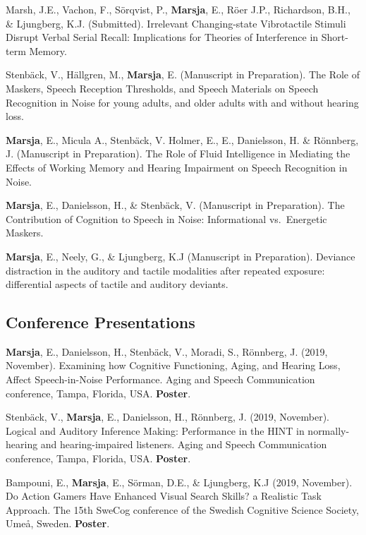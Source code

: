 \documentclass[]{article}
\begin{document}
Marsh, J.E., Vachon, F., Sörqvist, P., \textbf{Marsja}, E., Röer J.P.,
Richardson, B.H., \& Ljungberg, K.J. (Submitted). Irrelevant
Changing-state Vibrotactile Stimuli Disrupt Verbal Serial Recall:
Implications for Theories of Interference in Short-term Memory.

Stenbäck, V., Hällgren, M., \textbf{Marsja}, E. (Manuscript in
Preparation). The Role of Maskers, Speech Reception Thresholds, and
Speech Materials on Speech Recognition in Noise for young adults, and
older adults with and without hearing loss.

\textbf{Marsja}, E., Micula A., Stenbäck, V. Holmer, E., E., Danielsson,
H. \& Rönnberg, J. (Manuscript in Preparation). The Role of Fluid
Intelligence in Mediating the Effects of Working Memory and Hearing
Impairment on Speech Recognition in Noise.

\textbf{Marsja}, E., Danielsson, H., \& Stenbäck, V. (Manuscript in
Preparation). The Contribution of Cognition to Speech in Noise:
Informational vs.~Energetic Maskers.

\textbf{Marsja}, E., Neely, G., \& Ljungberg, K.J (Manuscript in
Preparation). Deviance distraction in the auditory and tactile
modalities after repeated exposure: differential aspects of tactile and
auditory deviants.

\hypertarget{conference-presentations}{%
\subsection{Conference Presentations}\label{conference-presentations}}

\textbf{Marsja}, E., Danielsson, H., Stenbäck, V., Moradi, S., Rönnberg,
J. (2019, November). Examining how Cognitive Functioning, Aging, and
Hearing Loss, Affect Speech-in-Noise Performance. Aging and Speech
Communication conference, Tampa, Florida, USA. \textbf{Poster}.

Stenbäck, V., \textbf{Marsja}, E., Danielsson, H., Rönnberg, J. (2019,
November). Logical and Auditory Inference Making: Performance in the
HINT in normally-hearing and hearing-impaired listeners. Aging and
Speech Communication conference, Tampa, Florida, USA. \textbf{Poster}.

Bampouni, E., \textbf{Marsja}, E., Sörman, D.E., \& Ljungberg, K.J
(2019, November). Do Action Gamers Have Enhanced Visual Search Skills? a
Realistic Task Approach. The 15th SweCog conference of the Swedish
Cognitive Science Society, Umeå, Sweden. \textbf{Poster}.
\end{document}
